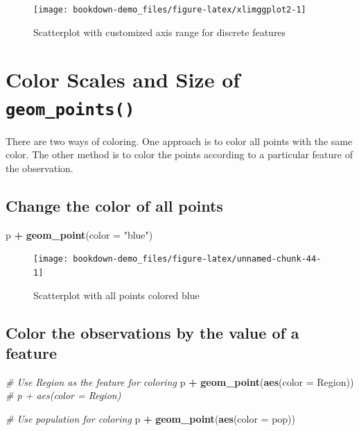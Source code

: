 \documentclass[]{book}
\newenvironment{Shaded}{\begin{snugshade}}{\end{snugshade}}
\newcommand{\KeywordTok}[1]{\textcolor[rgb]{0.13,0.29,0.53}{\textbf{#1}}}
\newcommand{\DataTypeTok}[1]{\textcolor[rgb]{0.13,0.29,0.53}{#1}}
\newcommand{\StringTok}[1]{\textcolor[rgb]{0.31,0.60,0.02}{#1}}
\newcommand{\CommentTok}[1]{\textcolor[rgb]{0.56,0.35,0.01}{\textit{#1}}}
\newcommand{\OperatorTok}[1]{\textcolor[rgb]{0.81,0.36,0.00}{\textbf{#1}}}
\newcommand{\NormalTok}[1]{#1}
\begin{document}
\begin{figure}

{\centering \texttt{[image: bookdown-demo\_files/figure-latex/xlimggplot2-1]} 

}

\caption{Scatterplot with customized axis range for discrete features}\label{fig:xlimggplot2}
\end{figure}

\section{\texorpdfstring{Color Scales and Size of
\texttt{geom\_points()}}{Color Scales and Size of geom\_points()}}\label{color-scales-and-size-of-geom_points}

There are two ways of coloring. One approach is to color all points with
the same color. The other method is to color the points according to a
particular feature of the observation.

\subsection{Change the color of all
points}\label{change-the-color-of-all-points}

\begin{Shaded}
\begin{Highlighting}[]
\NormalTok{p }\OperatorTok{+}\StringTok{ }\KeywordTok{geom_point}\NormalTok{(}\DataTypeTok{color =} \StringTok{"blue"}\NormalTok{)}
\end{Highlighting}
\end{Shaded}

\begin{figure}

{\centering \texttt{[image: bookdown-demo\_files/figure-latex/unnamed-chunk-44-1]} 

}

\caption{Scatterplot with all points colored blue}\label{fig:unnamed-chunk-44}
\end{figure}

\subsection{Color the observations by the value of a
feature}\label{color-the-observations-by-the-value-of-a-feature}

\begin{Shaded}
\begin{Highlighting}[]
\CommentTok{# Use Region as the feature for coloring}
\NormalTok{p }\OperatorTok{+}\StringTok{ }\KeywordTok{geom_point}\NormalTok{(}\KeywordTok{aes}\NormalTok{(}\DataTypeTok{color =}\NormalTok{ Region)) }
\CommentTok{# p + aes(color = Region) }

\CommentTok{# Use population for coloring}
\NormalTok{p }\OperatorTok{+}\StringTok{ }\KeywordTok{geom_point}\NormalTok{(}\KeywordTok{aes}\NormalTok{(}\DataTypeTok{color =}\NormalTok{ pop))}
\end{Highlighting}
\end{Shaded}
\end{document}
